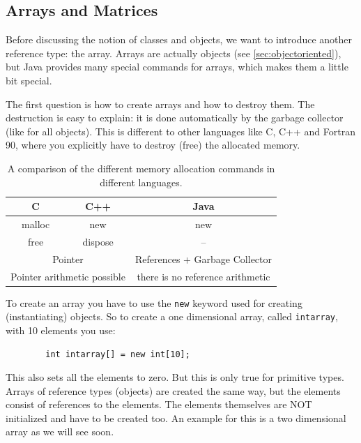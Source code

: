 
\subsection{Arrays and Matrices}
\label{sec:Arrays}

Before discussing the notion of classes and objects, we want to introduce
another reference type: the array. Arrays are actually objects
(see \ref{sec:objectoriented}), but
Java provides many special commands for arrays, which makes them a 
little bit special.

The first question is how to create arrays and how to destroy them.
The destruction is easy to explain: it is done automatically
by the garbage collector (like for all objects). This is different to
other languages like C, C++ and Fortran 90, where you explicitly
have to destroy (free) the allocated memory. 
\begin{table}[htbp]
  \begin{center}
    \begin{tabular}{c|c|c}
      C & C++ & Java \\\hline
      malloc & new & new \\
      free & dispose & -- \\
      \multicolumn{2}{c}{Pointer} & References + Garbage Collector \\
      \multicolumn{2}{c}{Pointer arithmetic possible}& there is no 
                                                    reference arithmetic \\
    \end{tabular}
    \caption{A comparison of the different memory allocation commands in different languages.}
    \label{tab:MemoryAllocation}
  \end{center}
\end{table}
To create an array you have to use the \verb|new| keyword used for
creating (instantiating) objects. So to create a one dimensional
array, called \verb|intarray|, with 10 elements you use:
\begin{verbatim}
        int intarray[] = new int[10];
\end{verbatim}
This also sets all the elements to zero. But this is only true for 
primitive types. Arrays of reference types (objects) are created the
same way, but the elements consist of references to the elements. The
elements themselves are NOT initialized and have to be created too.
An example for this is a two dimensional array as we will see soon.

